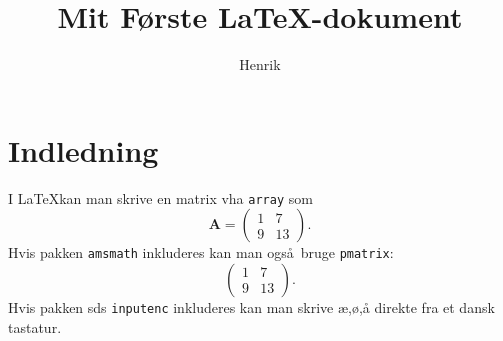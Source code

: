 \documentclass[12pt]{article}
\title{Mit F\o rste \LaTeX-dokument}
\author{Henrik}
\begin{document}
\maketitle

\section{Indledning}
I \LaTeX kan man skrive en matrix vha \verb!array! som 
$$
\mathbf A=
\left(\begin{array}{cc}
1&7\\9&13
\end{array}\right).
$$
Hvis pakken \verb!amsmath! inkluderes kan man ogs\aa\ bruge \verb!pmatrix!: 
$$
\begin{pmatrix}
1&7\\9&13
\end{pmatrix}.
$$
Hvis pakken sds \verb!inputenc! inkluderes kan man skrive æ,ø,å direkte fra et
dansk tastatur.
\end{document}
